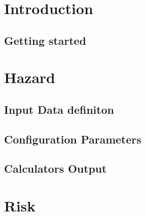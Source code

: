 \documentclass[12pt,a4paper,headings=small,version=first,dvips]{scrbook}
\begin{document}
\part{Introduction}
%	
\chapter{Getting started}
	
\part{Hazard}
\chapter{Input Data definiton}
	\label{chap:hazinp}
	
\chapter{Configuration Parameters}
	\label{chap:hazconf}
	
\chapter{Calculators Output}
	\label{chap:hazout}
	
\part{Risk}
%	
\end{document}
